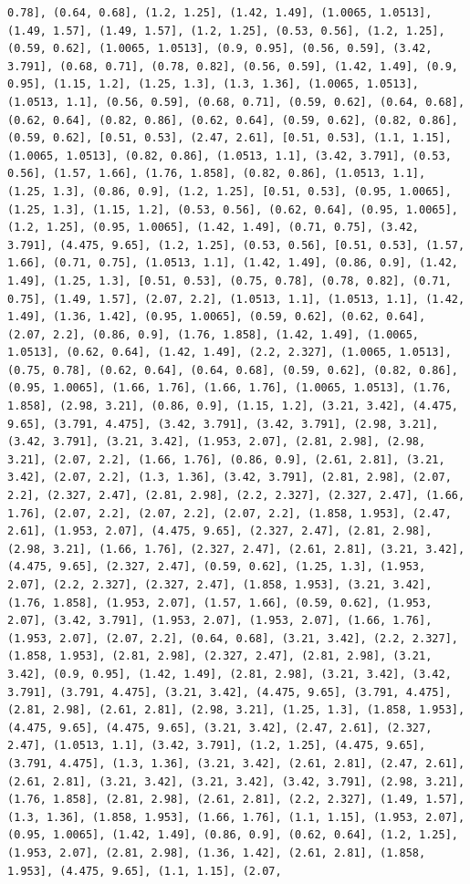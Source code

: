 \documentclass[12pt,fleqn]{article}\usepackage{../common}
\begin{document}
\begin{verbatim}
0.78], (0.64, 0.68], (1.2, 1.25], (1.42, 1.49], (1.0065, 1.0513], (1.49, 1.57], (1.49, 1.57], (1.2, 1.25], (0.53, 0.56], (1.2, 1.25], (0.59, 0.62], (1.0065, 1.0513], (0.9, 0.95], (0.56, 0.59], (3.42, 3.791], (0.68, 0.71], (0.78, 0.82], (0.56, 0.59], (1.42, 1.49], (0.9, 0.95], (1.15, 1.2], (1.25, 1.3], (1.3, 1.36], (1.0065, 1.0513], (1.0513, 1.1], (0.56, 0.59], (0.68, 0.71], (0.59, 0.62], (0.64, 0.68], (0.62, 0.64], (0.82, 0.86], (0.62, 0.64], (0.59, 0.62], (0.82, 0.86], (0.59, 0.62], [0.51, 0.53], (2.47, 2.61], [0.51, 0.53], (1.1, 1.15], (1.0065, 1.0513], (0.82, 0.86], (1.0513, 1.1], (3.42, 3.791], (0.53, 0.56], (1.57, 1.66], (1.76, 1.858], (0.82, 0.86], (1.0513, 1.1], (1.25, 1.3], (0.86, 0.9], (1.2, 1.25], [0.51, 0.53], (0.95, 1.0065], (1.25, 1.3], (1.15, 1.2], (0.53, 0.56], (0.62, 0.64], (0.95, 1.0065], (1.2, 1.25], (0.95, 1.0065], (1.42, 1.49], (0.71, 0.75], (3.42, 3.791], (4.475, 9.65], (1.2, 1.25], (0.53, 0.56], [0.51, 0.53], (1.57, 1.66], (0.71, 0.75], (1.0513, 1.1], (1.42, 1.49], (0.86, 0.9], (1.42, 1.49], (1.25, 1.3], [0.51, 0.53], (0.75, 0.78], (0.78, 0.82], (0.71, 0.75], (1.49, 1.57], (2.07, 2.2], (1.0513, 1.1], (1.0513, 1.1], (1.42, 1.49], (1.36, 1.42], (0.95, 1.0065], (0.59, 0.62], (0.62, 0.64], (2.07, 2.2], (0.86, 0.9], (1.76, 1.858], (1.42, 1.49], (1.0065, 1.0513], (0.62, 0.64], (1.42, 1.49], (2.2, 2.327], (1.0065, 1.0513], (0.75, 0.78], (0.62, 0.64], (0.64, 0.68], (0.59, 0.62], (0.82, 0.86], (0.95, 1.0065], (1.66, 1.76], (1.66, 1.76], (1.0065, 1.0513], (1.76, 1.858], (2.98, 3.21], (0.86, 0.9], (1.15, 1.2], (3.21, 3.42], (4.475, 9.65], (3.791, 4.475], (3.42, 3.791], (3.42, 3.791], (2.98, 3.21], (3.42, 3.791], (3.21, 3.42], (1.953, 2.07], (2.81, 2.98], (2.98, 3.21], (2.07, 2.2], (1.66, 1.76], (0.86, 0.9], (2.61, 2.81], (3.21, 3.42], (2.07, 2.2], (1.3, 1.36], (3.42, 3.791], (2.81, 2.98], (2.07, 2.2], (2.327, 2.47], (2.81, 2.98], (2.2, 2.327], (2.327, 2.47], (1.66, 1.76], (2.07, 2.2], (2.07, 2.2], (2.07, 2.2], (1.858, 1.953], (2.47, 2.61], (1.953, 2.07], (4.475, 9.65], (2.327, 2.47], (2.81, 2.98], (2.98, 3.21], (1.66, 1.76], (2.327, 2.47], (2.61, 2.81], (3.21, 3.42], (4.475, 9.65], (2.327, 2.47], (0.59, 0.62], (1.25, 1.3], (1.953, 2.07], (2.2, 2.327], (2.327, 2.47], (1.858, 1.953], (3.21, 3.42], (1.76, 1.858], (1.953, 2.07], (1.57, 1.66], (0.59, 0.62], (1.953, 2.07], (3.42, 3.791], (1.953, 2.07], (1.953, 2.07], (1.66, 1.76], (1.953, 2.07], (2.07, 2.2], (0.64, 0.68], (3.21, 3.42], (2.2, 2.327], (1.858, 1.953], (2.81, 2.98], (2.327, 2.47], (2.81, 2.98], (3.21, 3.42], (0.9, 0.95], (1.42, 1.49], (2.81, 2.98], (3.21, 3.42], (3.42, 3.791], (3.791, 4.475], (3.21, 3.42], (4.475, 9.65], (3.791, 4.475], (2.81, 2.98], (2.61, 2.81], (2.98, 3.21], (1.25, 1.3], (1.858, 1.953], (4.475, 9.65], (4.475, 9.65], (3.21, 3.42], (2.47, 2.61], (2.327, 2.47], (1.0513, 1.1], (3.42, 3.791], (1.2, 1.25], (4.475, 9.65], (3.791, 4.475], (1.3, 1.36], (3.21, 3.42], (2.61, 2.81], (2.47, 2.61], (2.61, 2.81], (3.21, 3.42], (3.21, 3.42], (3.42, 3.791], (2.98, 3.21], (1.76, 1.858], (2.81, 2.98], (2.61, 2.81], (2.2, 2.327], (1.49, 1.57], (1.3, 1.36], (1.858, 1.953], (1.66, 1.76], (1.1, 1.15], (1.953, 2.07], (0.95, 1.0065], (1.42, 1.49], (0.86, 0.9], (0.62, 0.64], (1.2, 1.25], (1.953, 2.07], (2.81, 2.98], (1.36, 1.42], (2.61, 2.81], (1.858, 1.953], (4.475, 9.65], (1.1, 1.15], (2.07, 
\end{verbatim}
\end{document}
